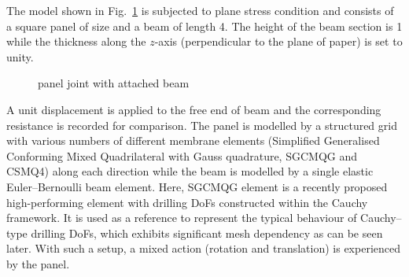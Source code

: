 \documentclass[3p,sort&compress,11pt,fleqn,review]{elsarticle}
\newcommand*{\figref}[1]{Fig.~\ref{#1}}
\begin{document}
The model shown in \figref{fig:joint_example} is subjected to plane stress condition and consists of a square panel of size  and a beam of length \num{4}. The height of the beam section is \num{1} while the thickness along the $z$-axis \alert{(perpendicular to the plane of paper)} is set to unity.
\begin{figure}[htb]
\centering\footnotesize
{}
\caption{panel joint with attached beam}\label{fig:joint_example}
\end{figure}
A unit displacement is applied to the free end of beam and the corresponding resistance is recorded for comparison. The panel is modelled by a structured grid with various numbers of \alert{different} membrane elements (Simplified Generalised Conforming Mixed Quadrilateral with Gauss quadrature, SGCMQG \citep{Chang2020} and CSMQ4) along each direction while the beam is modelled by a single elastic Euler--Bernoulli beam element. \alert{Here, SGCMQG element is a recently proposed high-performing element with drilling DoFs constructed within the Cauchy framework. It is used as a reference to represent the typical behaviour of Cauchy--type drilling DoFs, which exhibits significant mesh dependency as can be seen later.} With such a setup, a mixed action (rotation and translation) is experienced by the panel.
\end{document}
